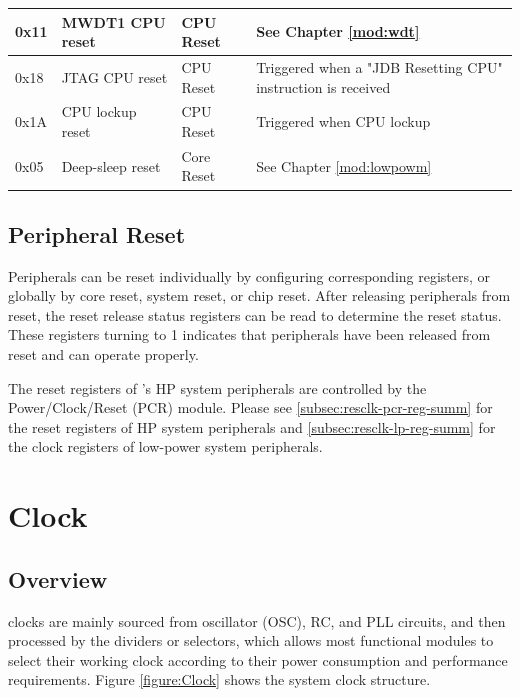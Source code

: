 \documentclass[main\_\_EN.tex]{subfiles}
\begin{document}
\begin{ThreePartTable}
\begin{longtable}[c]{ |l|m{3.5cm}|m{1.8cm}|m{9.2cm}| }
        0x11 & MWDT1 CPU reset & CPU Reset & See Chapter \ref{mod:wdt} \textit{\nameref{mod:wdt}}
        \\\hline
        0x18 & JTAG CPU reset & CPU Reset & Triggered when a "JDB Resetting CPU" instruction is received
        \\\hline
        0x1A & CPU lockup reset & CPU Reset & Triggered when CPU lockup\\\hline
        0x05 & Deep-sleep reset & Core Reset & See Chapter \ref{mod:lowpowm} \textit{\nameref{mod:lowpowm}}
        \\\hline
\end{longtable}
\end{ThreePartTable}


\subsection{Peripheral Reset}

Peripherals can be reset individually by configuring corresponding registers, or globally by core reset, system reset, or chip reset. After releasing peripherals from reset, the reset release status registers can be read to determine the reset status. These registers turning to 1 indicates that peripherals have been released from reset and can operate properly.

The reset registers of \chipname{}'s HP system peripherals are controlled by the Power/Clock/Reset (PCR) module. Please see \ref{subsec:resclk-pcr-reg-summ} \textit{} for the reset registers of HP system peripherals and \ref{subsec:resclk-lp-reg-summ} \textit{} for the clock registers of low-power system peripherals.

\section{Clock}

\subsection{Overview}

\chipname{} clocks are mainly sourced from oscillator (OSC), RC, and PLL circuits, and then processed by the dividers or selectors, which allows most functional modules to select their working clock according to their power consumption and performance requirements. Figure \ref{figure:Clock} shows the system clock structure.
\end{document}
